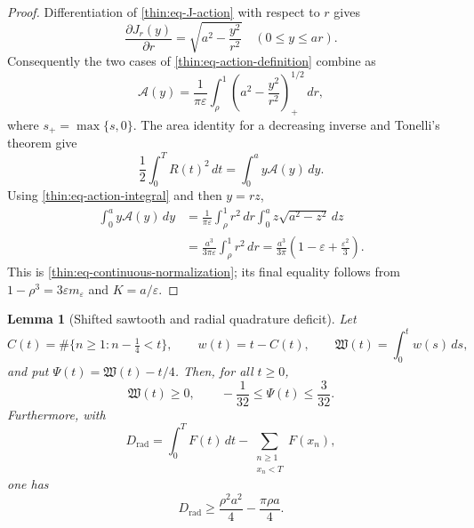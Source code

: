 \documentclass[11pt]{article}
\numberwithin{equation}{section}
\newtheorem{lemma}[theorem]{Lemma}
\theoremstyle{definition}
\theoremstyle{remark}
\begin{document}
\begin{proof}
Differentiation of \eqref{thin:eq-J-action} with respect to \(r\) gives
\[
  \frac{\partial J_r(y)}{\partial r}
  =\sqrt{a^2-\frac{y^2}{r^2}}
  \quad(0\leq y\leq ar).
\]
Consequently the two cases of \eqref{thin:eq-action-definition} combine as
\begin{equation}
  \mathcal A(y)
  =\frac1{\pi\varepsilon}
    \int_\rho^1
      \left(a^2-\frac{y^2}{r^2}\right)_+^{1/2}\,dr,
  \label{thin:eq-action-integral}
\end{equation}
where \(s_+=\max\{s,0\}\).
The area identity for a decreasing inverse and Tonelli's theorem give
\[
  \frac12\int_0^T R(t)^2\,dt
  =\int_0^a y\mathcal A(y)\,dy.
\]
Using \eqref{thin:eq-action-integral} and then \(y=rz\),
\[
\begin{aligned}
  \int_0^a y\mathcal A(y)\,dy
  &=\frac1{\pi\varepsilon}
    \int_\rho^1r^2\,dr
    \int_0^a z\sqrt{a^2-z^2}\,dz \\
  &=\frac{a^3}{3\pi\varepsilon}\int_\rho^1r^2\,dr
   =\frac{a^3}{3\pi}
      \left(1-\varepsilon+\frac{\varepsilon^2}{3}\right).
\end{aligned}
\]
This is \eqref{thin:eq-continuous-normalization}; its final equality follows
from \(1-\rho^3=3\varepsilon m_\varepsilon\) and \(K=a/\varepsilon\).
\end{proof}

\begin{lemma}[Shifted sawtooth and radial quadrature deficit]
\label{thin:lem-radial-deficit}
Let
\[
  C(t)=\#\{n\geq1:n-\tfrac14<t\},
  \qquad w(t)=t-C(t),
  \qquad \mathfrak W(t)=\int_0^t w(s)\,ds,
\]
and put \(\Psi(t)=\mathfrak W(t)-t/4\).  Then, for all \(t\geq0\),
\begin{equation}
  \mathfrak W(t)\geq0,
  \qquad
  -\frac1{32}\leq\Psi(t)\leq\frac3{32}.
  \label{thin:eq-sawtooth-bounds}
\end{equation}
Furthermore, with
\begin{equation}
  D_{\mathrm{rad}}
  =\int_0^T F(t)\,dt
   -\sum_{\substack{n\geq1\\x_n<T}}F(x_n),
  \label{thin:eq-radial-deficit-definition}
\end{equation}
one has
\begin{equation}
  D_{\mathrm{rad}}
  \geq\frac{\rho^2a^2}{4}-\frac{\pi\rho a}{4}.
  \label{thin:eq-radial-deficit-bound}
\end{equation}
\end{lemma}
\end{document}
